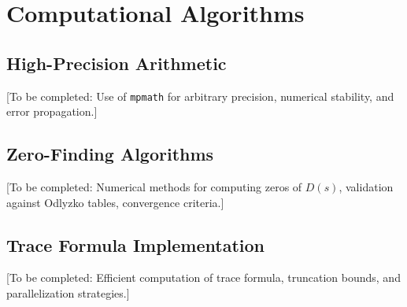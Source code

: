 \section{Computational Algorithms}

\subsection{High-Precision Arithmetic}

[To be completed: Use of \texttt{mpmath} for arbitrary precision, numerical stability, and error propagation.]

\subsection{Zero-Finding Algorithms}

[To be completed: Numerical methods for computing zeros of $D(s)$, validation against Odlyzko tables, convergence criteria.]

\subsection{Trace Formula Implementation}

[To be completed: Efficient computation of trace formula, truncation bounds, and parallelization strategies.]
